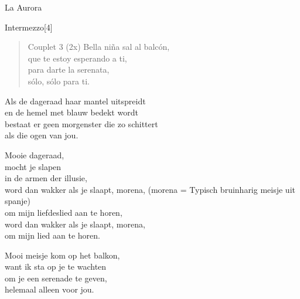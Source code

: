 \begin{song}[vals]{La Aurora}
\begin{instrumental}{Intermezzo}[4]
   
\end{instrumental}
\begin{verse}{Couplet 3 (2x)}
Bella niña sal al balcón,\\
que te estoy esperando a ti,\\
para darte la serenata,\\
sólo, sólo para ti. \hspace{1em}\hspace{2em}\\
\end{verse}
\end{song}

\clearpage

\begin{translation}
Als de dageraad haar mantel uitspreidt\\
en de hemel met blauw bedekt wordt\\
bestaat er geen morgenster die zo schittert\\
als die ogen van jou.\vspace{\wlskip}

Mooie dageraad,\\
mocht je slapen\\
in de armen der illusie,\\
word dan wakker als je slaapt, morena, (morena = Typisch bruinharig meisje uit spanje)\\
om mijn liefdeslied aan te horen,\\
word dan wakker als je slaapt, morena,\\
om mijn lied aan te horen.\vspace{\wlskip}

Mooi meisje kom op het balkon,\\
want ik sta op je te wachten\\
om je een serenade te geven,\\
helemaal alleen voor jou.\\
\end{translation}
